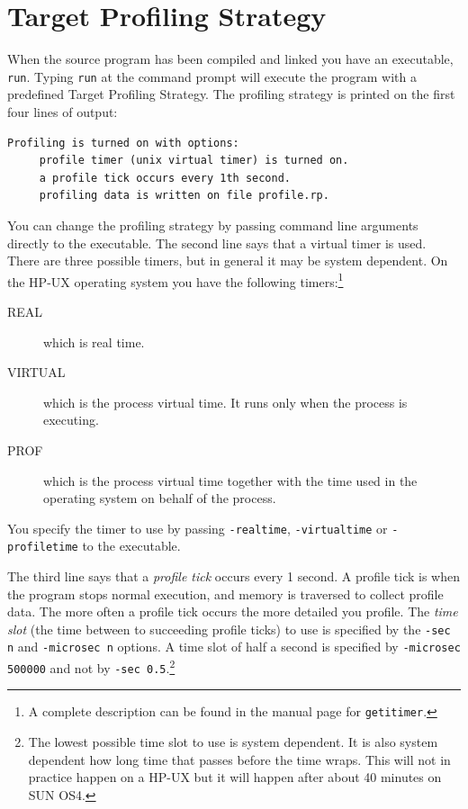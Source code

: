 \documentclass[12pt]{book}
\begin{document}
\section{Target Profiling Strategy}
When the source program has been compiled and linked you have an
executable, \texttt{run}. Typing \texttt{run} at the command prompt will
execute the program with a predefined 
%
Target Profiling Strategy.  The profiling strategy is printed on the
first four lines of output:

\begin{verbatim}
Profiling is turned on with options:
     profile timer (unix virtual timer) is turned on.
     a profile tick occurs every 1th second.
     profiling data is written on file profile.rp.
\end{verbatim}
\noindent
You can change the 
%
profiling strategy by passing command line arguments directly to the
executable.  The second line says that a virtual timer is used. There
are three possible timers, but in general it may be system dependent.
On the HP-UX operating system you have the following
timers:\footnote{A complete description can be found in the manual
  page for \texttt{getitimer}.}
\begin{description}
\item[REAL] which is real time.
\item[VIRTUAL] which is the process virtual time. It runs only when the
  process is executing.
\item[PROF] which is the process virtual time together with the time used
  in the operating system on behalf of the process.
\end{description}
\noindent
You specify the timer to use by passing
\texttt{-realtime},
\texttt{-virtualtime} or 
\texttt{-profiletime} to the executable.

The third line says that a 
%
\emph{profile tick} occurs every 1 second.  A profile tick is when the
program stops normal execution, and memory is traversed to collect
profile data. The more often a profile tick occurs the more detailed
you profile. The 
%
\emph{time slot} (the time between to succeeding profile ticks) to use
is specified by the \texttt{-sec n}
and \texttt{-microsec n}
options. A time slot of half a second is specified by
\texttt{-microsec 500000} and not by \texttt{-sec 0.5}.\footnote{The
  lowest possible time slot to use is system dependent. It is also
  system dependent how long time that passes before the time wraps.
  This will not in practice happen on a HP-UX but it will happen after
  about 40 minutes on SUN OS4.}
\end{document}
